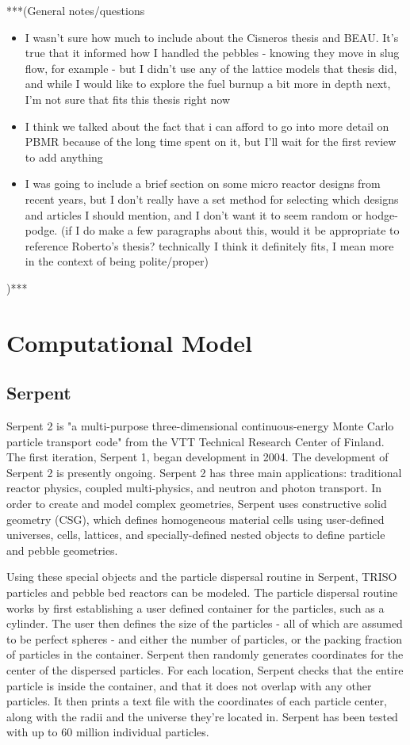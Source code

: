 ***(General notes/questions
\begin{itemize}
\item I wasn't sure how much to include about the Cisneros thesis and BEAU.  It's true that it informed how I handled the pebbles - knowing they move in slug flow, for example - but I didn't use any of the lattice models that thesis did, and while I would like to explore the fuel burnup a bit more in depth next, I'm not sure that fits this thesis right now
\item I think we talked about the fact that i can afford to go into more detail on PBMR because of the long time spent on it, but I'll wait for the first review to add anything
\item I was going to include a brief section on some micro reactor designs from recent years, but I don't really have a set method for selecting which designs and articles I should mention, and I don't want it to seem random or hodge-podge.  (if I do make a few paragraphs about this, would it be appropriate to reference Roberto's thesis? technically I think it definitely fits, I mean more in the context of being polite/proper)
\end{itemize}
)***
\section{Computational Model}

\subsection{Serpent}

Serpent 2 is "a multi-purpose three-dimensional continuous-energy Monte Carlo particle transport code" \cite{noauthor_serpent_nodate} from the VTT Technical Research Center of Finland.  The first iteration, Serpent 1, began development in 2004.  The development of Serpent 2 is presently ongoing.  Serpent 2 has three main applications: traditional reactor physics, coupled multi-physics, and neutron and photon transport.  In order to create and model complex geometries, Serpent uses constructive solid geometry (CSG), which defines homogeneous material cells using user-defined universes, cells, lattices, and specially-defined nested objects to define particle and pebble geometries.  

Using these special objects and the particle dispersal routine in Serpent, TRISO particles and pebble bed reactors can be modeled.  The particle dispersal routine works by first establishing a user defined container for the particles, such as a cylinder.  The user then defines the size of the particles - all of which are assumed to be perfect spheres - and either the number of particles, or the packing fraction of particles in the container.  Serpent then randomly generates coordinates for the center of the dispersed particles.  For each location, Serpent checks that the entire particle is inside the container, and that it does not overlap with any other particles.  It then prints a text file with the coordinates of each particle center, along with the radii and the universe they're located in.  Serpent has been tested with up to 60 million individual particles.


